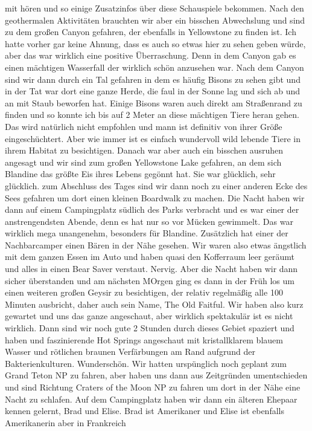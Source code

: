 \documentclass[11pt]{book}
\begin{document}
mit hören und so einige Zusatzinfos über diese Schauspiele bekommen. Nach den geothermalen Aktivitäten brauchten wir aber ein bisschen Abwechslung und sind 
zu dem großen Canyon gefahren, der ebenfalls in Yellowstone zu finden ist. Ich hatte vorher gar keine Ahnung, dass es auch so etwas hier zu sehen geben würde, 
aber das war wirklich eine positive Überraschung. Denn in dem Canyon gab es einen mächtigen Wasserfall der wirklich schön anzusehen war. Nach dem Canyon sind wir 
dann durch ein Tal gefahren in dem es häufig Bisons zu sehen gibt und in der Tat war dort eine ganze Herde, die faul in der Sonne lag und sich ab und an 
mit Staub beworfen hat. Einige Bisons waren auch direkt am Straßenrand zu finden und so konnte ich bis auf 2 Meter an diese mächtigen Tiere heran gehen. 
Das wird natürlich nicht empfohlen und mann ist definitiv von ihrer Größe eingeschüchtert. Aber wie immer ist es einfach wundervoll wild lebende Tiere in ihrem 
Habitat zu besichtigen. Danach war aber auch ein bisschen ausruhen angesagt und wir sind zum großen Yellowstone Lake gefahren, an dem sich Blandine das 
größte Eis ihres Lebens gegönnt hat. Sie war glücklich, sehr glücklich. zum Abschluss des Tages sind wir dann noch zu einer anderen Ecke des Sees gefahren 
um dort einen kleinen Boardwalk zu machen. 
Die Nacht haben wir dann auf einem Campingplatz südlich des Parks verbracht und es war einer der anstrengendsten Abende, denn es hat nur so vor Mücken gewimmelt. 
Das war wirklich mega unangenehm, besonders für Blandine. Zusätzlich hat einer der Nachbarcamper einen Bären in der Nähe gesehen. Wir waren also etwas 
ängstlich mit dem ganzen Essen im Auto und haben quasi den Kofferraum leer geräumt und alles in einen Bear Saver verstaut. Nervig. Aber die Nacht 
haben wir dann sicher überstanden und am nächsten MOrgen ging es dann in der Früh los um einen weiteren großen Geysir zu besichtigen, der relativ regelmäßig 
alle 100 Minuten ausbricht, daher auch sein Name, The Old Faitful. Wir haben also kurz gewartet und uns das ganze angeschaut, aber wirklich spektakulär ist es nicht 
wirklich. Dann sind wir noch gute 2 Stunden durch dieses Gebiet spaziert und haben und faszinierende Hot Springs angeschaut mit kristallklarem blauem Wasser 
und rötlichen braunen Verfärbungen am Rand aufgrund der Bakterienkulturen. Wunderschön. Wir hatten urspünglich noch geplant zum Grand Teton NP zu fahren, 
aber haben uns dann aus Zeitgründen umentschieden und sind Richtung Craters of the Moon NP zu fahren um dort in der Nähe eine Nacht zu schlafen. Auf 
dem Campingplatz haben wir dann ein älteren Ehepaar kennen gelernt, Brad und Elise. Brad ist Amerikaner und Elise ist ebenfalls Amerikanerin aber in Frankreich 
\end{document}
